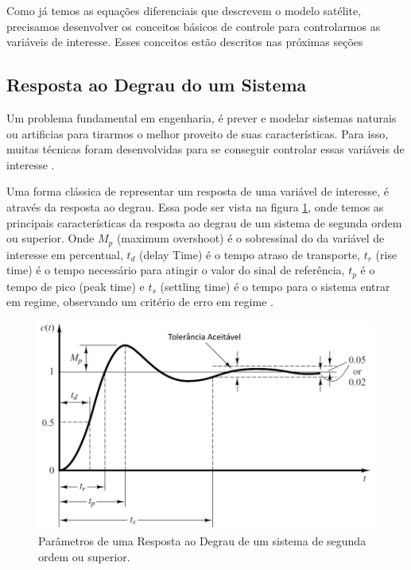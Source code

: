 Como já temos as equações diferenciais que descrevem o modelo satélite, precisamos desenvolver os conceitos básicos de controle para controlarmos as variáveis de interesse. Esses conceitos estão descritos nas próximas seções



\subsection{Resposta ao Degrau do um Sistema}

Um problema fundamental em engenharia, é prever e modelar sistemas naturais ou artificias para tirarmos o melhor proveito de suas características. Para isso, muitas técnicas foram desenvolvidas para se conseguir controlar essas variáveis de interesse \cite{Levine1996}.

Uma forma clássica de representar um resposta de uma variável de interesse, é através da resposta ao degrau. Essa pode ser vista na figura \ref{fig:transient_ogata_p170}, onde temos as principais características da resposta ao degrau de um sistema de segunda ordem ou superior. Onde \textit{$M_p$} (maximum overshoot) é o sobressinal do da variável de interesse em percentual, \textit{$t_d$} (delay Time) é o tempo atraso de transporte, \textit{$t_r$} (rise time) é o tempo necessário para atingir o valor do sinal de referência, \textit{$t_p$} é o tempo de pico (peak time) e \textit{$t_s$} (settling time) é o tempo para o sistema entrar em regime, observando um critério de erro em regime \cite{Ogata}.

\begin{figure}[H]
  \caption{Parâmetros de uma Resposta ao Degrau de um sistema de segunda ordem ou superior.}
  \begin{center}
      \includegraphics[scale=0.5]{img/transient_ogata_p170}
  \end{center}
  \label{fig:transient_ogata_p170}
\end{figure}


